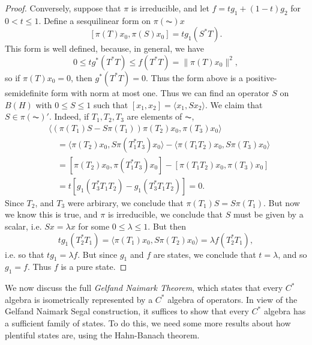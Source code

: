 \begin{proof}
    Conversely, suppose that $\pi$ is irreducible, and let $f = tg_1 + (1 - t) g_2$ for $0 < t \leq 1$. Define a sesquilinear form on $\pi(\AC) x$
    \[ [\pi(T) x_0, \pi(S) x_0] = t g_1(S^* T). \]
    This form is well defined, because, in general, we have
    \[ 0 \leq t g^*(T^*T) \leq f(T^* T) = \| \pi(T) x_0 \|^2, \]
    so if $\pi(T) x_0 = 0$, then $g^*(T^*T) = 0$. Thus the form above is a positive-semidefinite form with norm at most one. Thus we can find an operator $S$ on $B(H)$ with $0 \leq S \leq 1$ such that $[x_1,x_2] = \langle x_1, Sx_2 \rangle$. We claim that $S \in \pi(\AC)'$. Indeed, if $T_1,T_2,T_3$ are elements of $\AC$,
    \begin{align*}
        &\langle (\pi(T_1) S - S \pi(T_1) ) \pi(T_2) x_0, \pi(T_3) x_0 \rangle\\
        &\quad= \langle \pi(T_2) x_0, S \pi(T_1^* T_3) x_0 \rangle - \langle \pi(T_1 T_2) x_0, S \pi(T_3) x_0 \rangle\\
        &\quad= [\pi(T_2) x_0, \pi(T_1^* T_3) x_0] - [ \pi(T_1 T_2) x_0, \pi(T_3) x_0 ]\\
        &\quad= t [ g_1(T_3^* T_1 T_2) - g_1(T_3^* T_1 T_2) ] = 0.
    \end{align*}
    Since $T_2$, and $T_3$ were arbirary, we conclude that $\pi(T_1) S = S \pi(T_1)$. But now we know this is true, and $\pi$ is irreducible, we conclude that $S$ must be given by a scalar, i.e. $Sx = \lambda x$ for some $0 \leq \lambda \leq 1$. But then
    \[ t g_1(T_2^* T_1) = \langle \pi(T_1) x_0, S \pi(T_2) x_0 \rangle = \lambda f(T_2^* T_1), \]
    i.e. so that $t g_1 = \lambda f$. But since $g_1$ and $f$ are states, we conclude that $t = \lambda$, and so $g_1 = f$. Thus $f$ is a pure state.
\end{proof}

We now discuss the full \emph{Gelfand Naimark Theorem}, which states that every $C^*$ algebra is isometrically represented by a $C^*$ algebra of operators. In view of the Gelfand Naimark Segal construction, it suffices to show that every $C^*$ algebra has a sufficient family of states. To do this, we need some more results about how plentiful states are, using the Hahn-Banach theorem.

